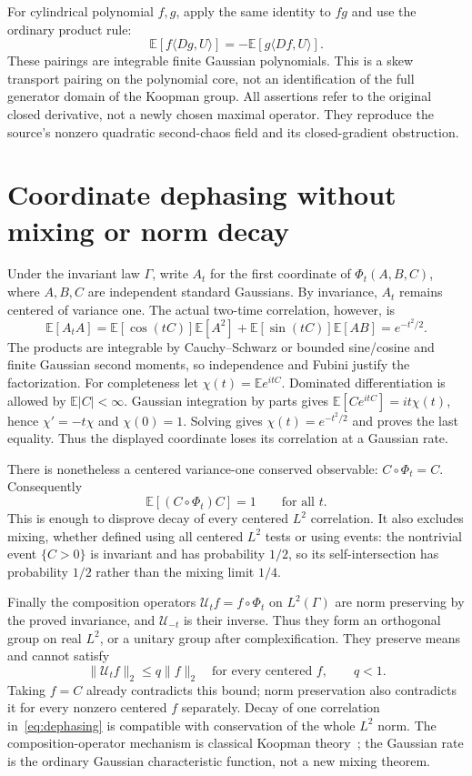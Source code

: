 \documentclass[11pt]{article}
\newcommand{\E}{\mathbb E}\newcommand{\Var}{\operatorname{Var}}
\begin{document}
For cylindrical polynomial $f,g$, apply the same identity to $fg$
and use the ordinary product rule:
\[
 \E[f\langle Dg,U\rangle]=-\E[g\langle Df,U\rangle].
\]
These pairings are integrable finite Gaussian polynomials. This is a
skew transport pairing on the polynomial core, not an identification
of the full generator domain of the Koopman group. All assertions
refer to the original closed derivative, not a newly chosen maximal
operator. They reproduce the source's nonzero quadratic second-chaos
field and its closed-gradient obstruction.

\section{Coordinate dephasing without mixing or norm decay}\label{sec:dephasing}
Under the invariant law $\Gamma$, write $A_t$ for the first coordinate
of $\Phi_t(A,B,C)$, where $A,B,C$ are independent standard Gaussians.
By invariance, $A_t$ remains centered of variance one. The actual
two-time correlation, however, is
\begin{equation}\label{eq:dephasing}
 \E[A_tA]=\E[\cos(tC)]\E[A^2]
             +\E[\sin(tC)]\E[AB]=e^{-t^2/2}.
\end{equation}
The products are integrable by Cauchy--Schwarz or bounded sine/cosine
and finite Gaussian second moments, so independence and Fubini
justify the factorization. For completeness let
$\chi(t)=\E e^{itC}$. Dominated differentiation is allowed by
$\E|C|<\infty$. Gaussian integration by parts gives
$\E[Ce^{itC}]=it\chi(t)$, hence $\chi'=-t\chi$ and $\chi(0)=1$.
Solving gives $\chi(t)=e^{-t^2/2}$ and proves the last equality.
Thus the displayed coordinate loses its correlation at a Gaussian rate.

There is nonetheless a centered variance-one conserved observable:
$C\circ\Phi_t=C$. Consequently
\begin{equation}\label{eq:fixedcorrelation}
 \E[(C\circ\Phi_t)C]=1\qquad\text{for all }t.
\end{equation}
This is enough to disprove decay of every centered $L^2$ correlation.
It also excludes mixing, whether defined using all centered $L^2$
tests or using events: the nontrivial event $\{C>0\}$ is invariant
and has probability $1/2$, so its self-intersection has probability
$1/2$ rather than the mixing limit $1/4$.

Finally the composition operators $\mathcal U_t f=f\circ\Phi_t$ on
$L^2(\Gamma)$ are norm preserving by the proved invariance, and
$\mathcal U_{-t}$ is their inverse. Thus they form an orthogonal
group on real $L^2$, or a unitary group after complexification.
They preserve means and cannot satisfy
\[
 \|\mathcal U_t f\|_2\leq q\|f\|_2\quad
 \text{for every centered }f,\qquad q<1.
\]
Taking $f=C$ already contradicts this bound; norm preservation also
contradicts it for every nonzero centered $f$ separately. Decay of
one correlation in~\eqref{eq:dephasing} is compatible with conservation
of the whole $L^2$ norm. The composition-operator mechanism is
classical Koopman theory~\cite{koopman}; the Gaussian rate is the
ordinary Gaussian characteristic function, not a new mixing theorem.
\end{document}
